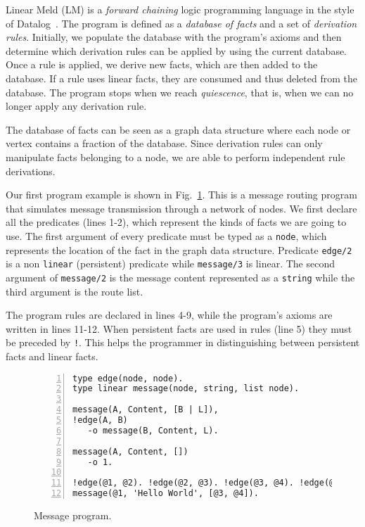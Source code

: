 
Linear Meld (LM) is a \emph{forward chaining} logic programming language in the style of Datalog~\cite{Ullman:1990:PDK:533142}. The program is defined as a \emph{database of facts} and a set of \emph{derivation rules}.
Initially, we populate the database with the program's axioms and then determine which derivation rules can be applied by using the current database. Once a rule is applied, we derive new facts, which are then added to the database.
If a rule uses linear facts, they are consumed and thus deleted from the database.
The program stops when we reach \emph{quiescence}, that is, when we can no longer
apply any derivation rule.

The database of facts can be seen as a graph data structure where each node or vertex contains a
fraction of the database.  Since derivation rules can only manipulate facts belonging to
a node, we are able to perform independent rule derivations.

Our first program example is shown in Fig.~\ref{code:message}. This is a message routing program
that simulates message transmission through a network of nodes.
We first declare all the predicates (lines 1-2), which represent the kinds of facts we are going to
use. The first argument of every predicate must be typed as a \texttt{node}, which represents the location of the fact in
the graph data structure. Predicate \texttt{edge/2} is a non \texttt{linear} (persistent) predicate while \texttt{message/3} is linear.
The second argument of \texttt{message/2} is the message content represented as a \texttt{string}
while the third argument is the route list.

The program rules are declared in lines 4-9, while the program's axioms are written in lines 11-12.
When persistent facts are used in rules (line 5) they must be
preceded by \texttt{!}. This helps the programmer in distinguishing between persistent facts and linear facts.

\begin{figure}[h!]
\small\begin{Verbatim}[numbers=left]
type edge(node, node).
type linear message(node, string, list node).

message(A, Content, [B | L]),
!edge(A, B)
   -o message(B, Content, L).

message(A, Content, [])
   -o 1.

!edge(@1, @2). !edge(@2, @3). !edge(@3, @4). !edge(@1, @3).
message(@1, 'Hello World', [@3, @4]).
\end{Verbatim}
\caption{Message program.}
  \label{code:message}
\end{figure}

